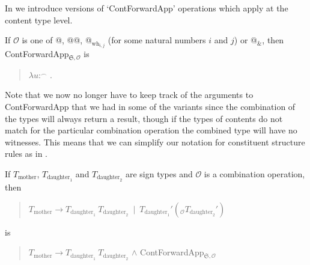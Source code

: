 In \nexteg{} we introduce versions of `ContForwardApp' operations which
apply at the content type level.
\begin{ex} 
If $\mathcal{O}$ is one of @, @@, @$_{\text{wh}_{i,j}}$ (for some
natural numbers $i$ and $j$) or @$_{\&}$, then
ContForwardApp$_{\mathfrak{S},\mathcal{O}}$ is
\begin{quote}
  $\lambda u$:$^\frown$ . 
\end{quote}

\end{ex} 
Note that we now no longer have to keep track of the arguments to
ContForwardApp that we had in some of the variants since the
combination of the types will always return a result, though if the
types of contents do not match for the particular combination
operation the combined type will have no witnesses.  This means that
we can simplify our notation for constituent structure rules as in
\nexteg{}.
\begin{ex} 
If $T_{\text{mother}}$, $T_{\text{daughter}_1}$ and
  $T_{\text{daughter}_2}$ are sign types and $\mathcal{O}$ is a
  combination operation, then
  \begin{quote}
    $T_{\text{mother}}\longrightarrow
    T_{\text{daughter}_1}\ T_{\text{daughter}_2}\ \mid\
    T_{\text{daughter}_1}'(_{\mathcal{O}}T_{\text{daughter}_2}')$
  \end{quote}
  is
  \begin{quote}
  $T_{\text{mother}}\longrightarrow
    T_{\text{daughter}_1}\ T_{\text{daughter}_2}$ \d{\d{$\wedge$}}
    ContForwardApp$_{\mathfrak{S},\mathcal{O}}$
  \end{quote}
  
\end{ex} 
  
  



